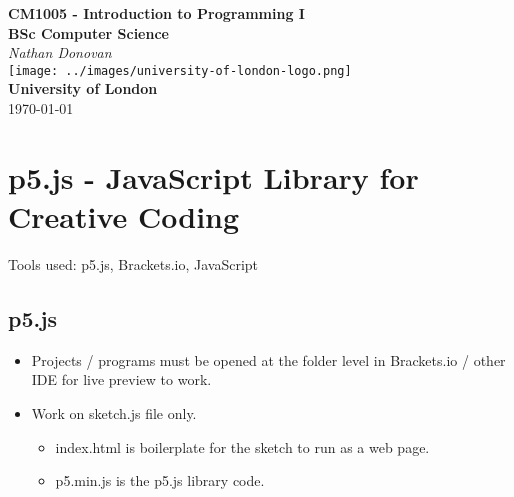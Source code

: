 \documentclass{article}
\begin{document}
\begin{titlepage}
    \centering
    \vspace*{2cm} %
    
    {\LARGE\bfseries CM1005 - Introduction to Programming I}\\[0.8cm]
    {\large\bfseries BSc Computer Science}\\[0.5cm] %
    
    {\large\textit{Nathan Donovan}}\\[1.5cm] %

    \texttt{[image: ../images/university-of-london-logo.png]}\\[1.5cm] %
    {\Large\bfseries University of London}\\[1cm] %
    {\large \today}

    \vfill %
    
    
\end{titlepage}

\newpage
\section{p5.js - JavaScript Library for Creative Coding}
Tools used: p5.js, Brackets.io, JavaScript

\subsection*{p5.js}
\begin{itemize}
    \item Projects / programs must be opened at the folder level in Brackets.io / other IDE for live preview to work.
    \item Work on sketch.js file only. 
        \begin{itemize}
            \item index.html is boilerplate for the sketch to run as a web page.
            \item p5.min.js is the p5.js library code.
        \end{itemize}
\end{itemize}
\end{document}
